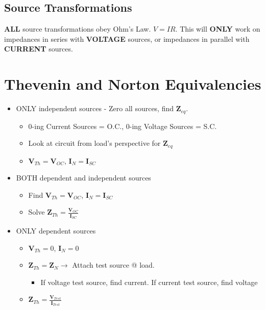 \documentclass[10pt,letterpaper,final,twoside,notitlepage]{article}
\begin{document}
	\subsection*{Source Transformations} \label{sec:Source Transforms}
		\textbf{ALL} source transformations obey Ohm's Law. $V=IR$.
		This will \textbf{ONLY} work on impedances in series with \textbf{VOLTAGE} sources, or impedances in parallel with \textbf{CURRENT} sources.

\section*{Thevenin and Norton Equivalencies} \label{sec:Thevenin/Norton}
	\begin{itemize}[noitemsep, nolistsep]
		\item ONLY independent sources - Zero all sources, find $\mathbf{Z}_{eq}$.
		\begin{itemize}[noitemsep, nolistsep]
			\item 0-ing Current Sources = O.C., 0-ing Voltage Sources = S.C.
			\item Look at circuit from load's perspective for $\mathbf{Z}_{eq}$
			\item $\mathbf{V}_{Th}=\mathbf{V}_{OC}$, $\mathbf{I}_{N} = \mathbf{I}_{SC}$
		\end{itemize}
		\item BOTH dependent and independent sources
			\begin{itemize}[noitemsep, nolistsep]
				\item Find $\mathbf{V}_{Th}=\mathbf{V}_{OC}$, $\mathbf{I}_{N}=\mathbf{I}_{SC}$
				\item Solve $\mathbf{Z}_{Th}=\frac{\mathbf{V}_{OC}}{\mathbf{I}_{SC}}$
			\end{itemize}
		\item ONLY dependent sources
			\begin{itemize}[noitemsep, nolistsep]
				\item $\mathbf{V}_{Th}=0$, $\mathbf{I}_{N}=0$
				\item $\mathbf{Z}_{Th}=\mathbf{Z}_{N} \rightarrow$ Attach test source @ load.
				\begin{itemize}
					\item If voltage test source, find current. If current test source, find voltage
				\end{itemize}
				\item $\mathbf{Z}_{Th}=\frac{\mathbf{V}_{Test}}{\mathbf{I}_{Test}}$
			\end{itemize}
		\end{itemize}
\end{document}
